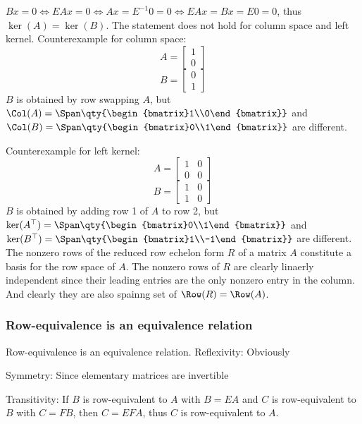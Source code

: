 \documentclass[a4paper,12pt]{report}
\begin{document}
$Bx=0\iff EAx=0\iff Ax=E^{-1}0=0\iff EAx=Bx=E0=0$, thus $\ker(A)=\ker(B)$.
\epr
The statement does not hold for column space and left kernel.
\bpr
Counterexample for column space:
\[A=\begin{bmatrix}1\\0\end{bmatrix}\]
\[B=\begin{bmatrix}0\\1\end{bmatrix}\]
$B$ is obtained by row swapping $A$, but $\Col(A)=\Span\qty{\begin{bmatrix}1\\0\end{bmatrix}}$ and $\Col(B)=\Span\qty{\begin{bmatrix}0\\1\end{bmatrix}}$ are different.

Counterexample for left kernel:
\[A=\begin{bmatrix}1&0\\0&0\end{bmatrix}\]
\[B=\begin{bmatrix}1&0\\1&0\end{bmatrix}\]
$B$ is obtained by adding row 1 of $A$ to row 2, but $\ker(A^\top)=\Span\qty{\begin{bmatrix}0\\1\end{bmatrix}}$ and $\ker(B^\top)=\Span\qty{\begin{bmatrix}1\\-1\end{bmatrix}}$ are different.
\epr
{}
The nonzero rows of the reduced row echelon form $R$ of a matrix $A$ constitute a basis for the row space of $A$.
\bpr
The nonzero rows of $R$ are clearly linaerly independent since their leading entries are the only nonzero entry in the column. And clearly they are also spainng set of $\Row(R)=\Row(A)$.
\epr
\subsubsection{Row-equivalence is an equivalence relation}
Row-equivalence is an equivalence relation.
\bpr
Reflexivity: Obviously

Symmetry: Since elementary matrices are invertible

Transitivity: If $B$ is row-equivalent to $A$ with $B=EA$ and $C$ is row-equivalent to $B$ with $C=FB$, then $C=EFA$, thus $C$ is row-equivalent to $A$.
\epr
\end{document}
